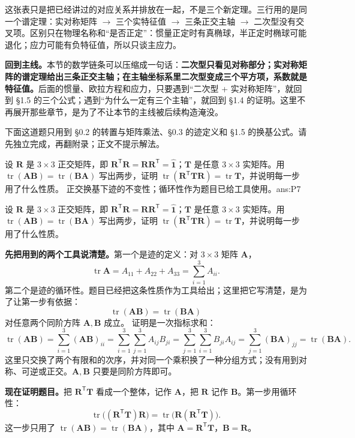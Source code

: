 \documentclass[11pt]{ctexart}
\newcommand{\ten}[1]{\mathbf{#1}}
\newcommand{\unitd}{\hat{\ten{1}}}
\newcommand{\tr}{\operatorname{tr}}
\let\orighdr\hdr
\renewcommand{\hdr}[2]{\par\needspace{10\baselineskip}\orighdr{#1}{#2}}
\begin{document}
这张表只是把已经讲过的对应关系并排放在一起，不是三个新定理。三行用的是同一个谱定理：实对称矩阵 $\to$ 三个实特征值 $\to$ 三条正交主轴 $\to$ 二次型没有交叉项。区别只在物理名称和“是否正定”：惯量正定时有真椭球，半正定时椭球可能退化；应力可能有负特征值，所以只谈主应力。

\textbf{回到主线。}本节的数学链条可以压缩成一句话：\textbf{二次型只看见对称部分；实对称矩阵的谱定理给出三条正交主轴；在主轴坐标系里二次型变成三个平方项，系数就是特征值。}后面的惯量、欧拉方程和应力，只要遇到“二次型 + 实对称矩阵”，就回到 §1.5 的三个公式；遇到“为什么一定有三个主轴”，就回到 §1.4 的证明。这里不再展开那些章节，是为了不让本节的主线被后续构造淹没。


下面这道题只用到 §0.2 的转置与矩阵乘法、§0.3 的迹定义和 §1.5 的换基公式。请先独立完成，再翻附录；正文不提示解法。

{设 $\ten R$ 是 $3\times3$ 正交矩阵，即 $\ten R^{\mathsf T}\ten R=\ten R\ten R^{\mathsf T}=\unitd$；$\ten T$ 是任意 $3\times3$ 实矩阵。用 $\tr(\ten A\ten B)=\tr(\ten B\ten A)$ 写出两步，证明 $\tr(\ten R^{\mathsf T}\ten T\ten R)=\tr\ten T$，并说明每一步用了什么性质。}
{正交换基下迹的不变性；循环性作为题目已给工具使用。}{ans:P7}

\clearpage
\appendix
{}

{设 $\ten R$ 是 $3\times3$ 正交矩阵，即 $\ten R^{\mathsf T}\ten R=\ten R\ten R^{\mathsf T}=\unitd$；$\ten T$ 是任意 $3\times3$ 实矩阵。用 $\tr(\ten A\ten B)=\tr(\ten B\ten A)$ 写出两步，证明 $\tr(\ten R^{\mathsf T}\ten T\ten R)=\tr\ten T$，并说明每一步用了什么性质。}

\textbf{先把用到的两个工具说清楚。}第一个是迹的定义：对 $3\times3$ 矩阵 $\ten A$，
\[
\tr\ten A=A_{11}+A_{22}+A_{33}=\sum_{i=1}^{3}A_{ii}.
\]
第二个是迹的循环性。题目已经把这条性质作为工具给出；这里把它写清楚，是为了让第一步有依据：
\[
\tr(\ten A\ten B)=\tr(\ten B\ten A)
\]
对任意两个同阶方阵 $\ten A,\ten B$ 成立。
证明是一次指标求和：
\[
\tr(\ten A\ten B)
=\sum_{i=1}^{3}(\ten A\ten B)_{ii}
=\sum_{i=1}^{3}\sum_{j=1}^{3}A_{ij}B_{ji}
=\sum_{j=1}^{3}\sum_{i=1}^{3}B_{ji}A_{ij}
=\sum_{j=1}^{3}(\ten B\ten A)_{jj}
=\tr(\ten B\ten A).
\]
这里只交换了两个有限和的次序，并对同一个乘积换了一种分组方式；没有用到对称、可逆或正交。$\ten A,\ten B$ 只要是同阶方阵即可。

\textbf{现在证明题目。}把 $\ten R^{\mathsf T}\ten T$ 看成一个整体，记作 $\ten A$，把 $\ten R$ 记作 $\ten B$。第一步用循环性：
\[
\tr\bigl((\ten R^{\mathsf T}\ten T)\ten R\bigr)
=\tr\bigl(\ten R(\ten R^{\mathsf T}\ten T)\bigr).
\]
这一步只用了 $\tr(\ten A\ten B)=\tr(\ten B\ten A)$，其中 $\ten A=\ten R^{\mathsf T}\ten T$，$\ten B=\ten R$。
\end{document}
